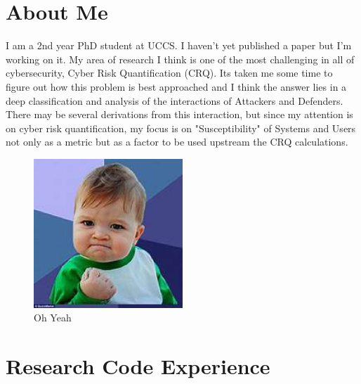 
% 


\section{About Me}
I am a 2nd year PhD student at UCCS.  I haven't yet published a paper but I'm working on it.  My area of research I think is one of the most challenging in all of cybersecurity, Cyber Risk Quantification (CRQ).  Its taken me some time to figure out how this problem is best approached and I think the answer lies in a deep classification and analysis of the interactions of Attackers and Defenders. There may be several derivations from this interaction, but since my attention is on cyber risk quantification, my focus is on "Susceptibility" of Systems and Users not only as a metric but as a factor to be used upstream the CRQ calculations.

\begin{figure}[h]
    \centering
    \includegraphics[width=0.5\textwidth]{images/Oh_Yeah.jpg}
    \caption{Oh Yeah}
    \label{fig:oh-yeah}
\end{figure}

\section{Research Code Experience}
